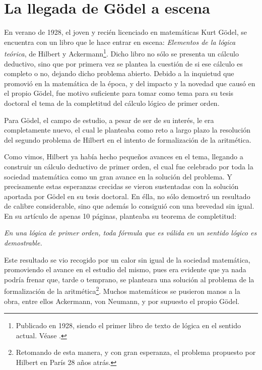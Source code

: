 \section{La llegada de Gödel a escena} 

En verano de 1928, el joven y recién licenciado en matemáticas Kurt Gödel, se encuentra con un libro que le hace entrar en escena: \textit{Elementos de la lógica teórica}, de 
Hilbert y Ackermann\footnote{Publicado en 1928, siendo el primer libro de texto de lógica en el sentido actual. Véase \cite{hilbert1962elementos}.}. Dicho libro no sólo se presenta un cálculo deductivo, 
sino que por primera vez se plantea la cuestión de si ese cálculo es completo o no, dejando dicho problema abierto. Debido a la inquietud que promovió en la matemática de la época,
y del impacto y la novedad que causó en el propio Gödel, fue motivo suficiente para tomar como tema para su tesis doctoral el tema de la completitud del cálculo lógico de primer orden.

Para Gödel, el campo de estudio, a pesar de ser de su interés, le era completamente nuevo, el cual le planteaba como reto a largo plazo la resolución del segundo problema
de Hilbert en el intento de formalización de la aritmética. 

Como vimos, Hilbert ya había hecho pequeños avances en el tema, llegando a construir un cálculo deductivo de primer orden, el cual fue celebrado por toda la sociedad matemática 
como un gran avance en la solución del problema. Y precisamente estas esperanzas crecidas se vieron sustentadas con la solución aportada por Gödel en su tesis doctoral. En élla, 
no sólo demostró un resultado de calibre considerable, sino que además lo consiguió con una brevedad sin igual. En su artículo de apenas 10 páginas, planteaba su teorema de completitud:

\begin{center}
    \textit{En una lógica de primer orden, toda fórmula que es válida en un sentido lógico es demostrable.}
\end{center}

Este resultado se vio recogido por un calor sin igual de la sociedad matemática, promoviendo el avance en el estudio del mismo, pues era evidente que ya nada podría frenar que, tarde o 
temprano, se planteara una solución al problema de la formalización de la aritmética\footnote{Retomando de esta manera, y con gran esperanza, el problema propuesto por Hilbert en París 
28 años atrás.}. Muchos matemáticos se pusieron manos a la obra, entre ellos Ackermann, von Neumann,
y por supuesto el propio Gödel.

